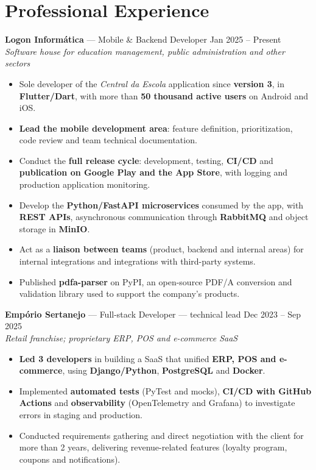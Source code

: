 \documentclass[10.5pt,a4paper]{article}
\newcommand{\cargo}[4]{%
  \Needspace*{5\baselineskip}%
  \textbf{#1} \textnormal{---} #2 \hfill \textnormal{#3}\\
  \textit{\small #4}\vspace{0.4ex}
}
\begin{document}
\section*{Professional Experience}

\cargo{Logon Informática}{Mobile \& Backend Developer}{Jan 2025 -- Present}{Software house for
education management, public administration and other sectors}
\begin{itemize}
  \item Sole developer of the \textit{Central da Escola} application since \textbf{version 3}, in
        \textbf{Flutter/Dart}, with more than \textbf{50 thousand active users} on Android and iOS.
  \item \textbf{Lead the mobile development area}: feature definition, prioritization, code review
        and team technical documentation.
  \item Conduct the \textbf{full release cycle}: development, testing, \textbf{CI/CD} and
        \textbf{publication on Google Play and the App Store}, with logging and production
        application monitoring.
  \item Develop the \textbf{Python/FastAPI microservices} consumed by the app, with \textbf{REST
        APIs}, asynchronous communication through \textbf{RabbitMQ} and object storage in
        \textbf{MinIO}.
  \item Act as a \textbf{liaison between teams} (product, backend and internal areas) for internal
        integrations and integrations with third-party systems.
  \item Published \textbf{pdfa-parser} on PyPI, an open-source PDF/A conversion and validation
        library used to support the company's products.
\end{itemize}

\cargo{Empório Sertanejo}{Full-stack Developer --- technical lead}{Dec 2023 -- Sep 2025}{Retail
franchise; proprietary ERP, POS and e-commerce SaaS}
\begin{itemize}
  \item \textbf{Led 3 developers} in building a SaaS that unified \textbf{ERP, POS and e-commerce},
        using \textbf{Django/Python}, \textbf{PostgreSQL} and \textbf{Docker}.
  \item Implemented \textbf{automated tests} (PyTest and mocks), \textbf{CI/CD with GitHub Actions}
        and \textbf{observability} (OpenTelemetry and Grafana) to investigate errors in staging and
        production.
  \item Conducted requirements gathering and direct negotiation with the client for more than
        2 years, delivering revenue-related features (loyalty program, coupons and notifications).
\end{itemize}
\end{document}
